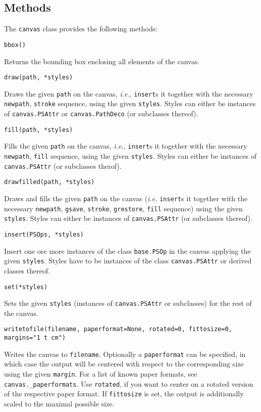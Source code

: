 \subsection{Methods}



The \verb|canvas| class provides the following methods:


\verb|bbox()| 

Returns the bounding box enclosing all elements of the canvas.

\verb|draw(path, *styles)|

Draws the given \verb|path| on the canvas, \textit{i.e.}, 
\verb|insert|s it together with the necessary \verb|newpath|,
\verb|stroke| sequence, using the given \verb|styles|. Styles can
either be instances of \verb|canvas.PSAttr| or \verb|canvas.PathDeco|
(or subclasses thereof).

\verb|fill(path, *styles)|

Fills the given \verb|path| on the canvas, \textit{i.e.},
\verb|insert|s it together with the necessary \verb|newpath|,
\verb|fill| sequence, using the given \verb|styles|. Styles can
either be instances of \verb|canvas.PSAttr| (or subclasses therof).

\verb|drawfilled(path, *styles)|

Draws and fills the given \verb|path| on the canvas (\textit{i.e.}
\verb|insert|s it together with the necessary \verb|newpath|,
\verb|gsave|, \verb|stroke|, \verb|grestore|, \verb|fill| sequence)
using the given \verb|styles|. Styles can either be instances of
\verb|canvas.PSAttr| (or subclasses thereof).



\verb|insert(PSOps, *styles)|

Insert one ore more instances of the class \verb|base.PSOp| in the
canvas applying the given \verb|styles|.  Styles have to be instances
of the class \verb|canvas.PSAttr| or derived classes thereof.

\verb|set(*styles)|

Sets the given \verb|styles| (instances of \verb|canvas.PSAttr| or
subclasses) for the rest of the canvas.

\verb|writetofile(filename, paperformat=None, rotated=0, fittosize=0, margins="1 t cm")|

Writes the canvas to \verb|filename|. Optionally a \verb|paperformat|
can be specified, in which case the output will be centered with
respect to the corresponding size using the given \verb|margin|. For a
list of known paper formats, see \verb|canvas._paperformats|. Use
\verb|rotated|, if you want to center on a rotated version of the
respective paper format. If \verb|fittosize| is set, the output is
additionally scaled to the maximal possible size.


